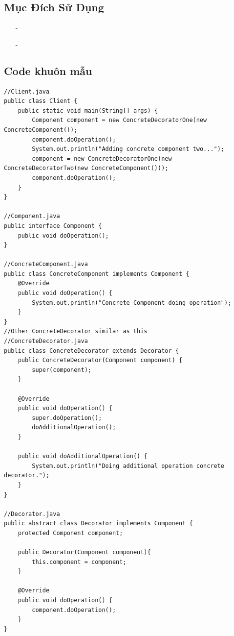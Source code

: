 \documentclass{article}
\newcommand\subpara{\fontsize{13}{13}\selectfont \fontseries{b}\selectfont}
\begin{document}
    \subsection{Mục Đích Sử Dụng}
    \begin{itemize}
        \item[-]\subpara{Thêm tính năng mới cho đối tượng mà không ảnh hưởng đến các đối tượng}
        \item[-]\subpara{Trong các trường hợp mà việc sử dụng kế thừa sẽ mất nhiều công sức trong việc viết code hoặc không thể mở rộng đối tượng bằng thừa kế}
    \end{itemize}


    \subsection{Code khuôn mẫu}
    \begin{lstlisting}
//Client.java
public class Client {
    public static void main(String[] args) {
        Component component = new ConcreteDecoratorOne(new ConcreteComponent());
        component.doOperation();
        System.out.println("Adding concrete component two...");
        component = new ConcreteDecoratorOne(new ConcreteDecoratorTwo(new ConcreteComponent()));
        component.doOperation();
    }
}

//Component.java
public interface Component {
    public void doOperation();
}

//ConcreteComponent.java
public class ConcreteComponent implements Component {
    @Override
    public void doOperation() {
        System.out.println("Concrete Component doing operation");
    }
}
//Other ConcreteDecorator similar as this
//ConcreteDecorator.java
public class ConcreteDecorator extends Decorator {
    public ConcreteDecorator(Component component) {
        super(component);
    }

    @Override
    public void doOperation() {
        super.doOperation();
        doAdditionalOperation();
    }

    public void doAdditionalOperation() {
        System.out.println("Doing additional operation concrete decorator.");
    }
}

//Decorator.java
public abstract class Decorator implements Component {
    protected Component component;

    public Decorator(Component component){
        this.component = component;
    }

    @Override
    public void doOperation() {
        component.doOperation();
    }
}
    \end{lstlisting}
\end{document}

